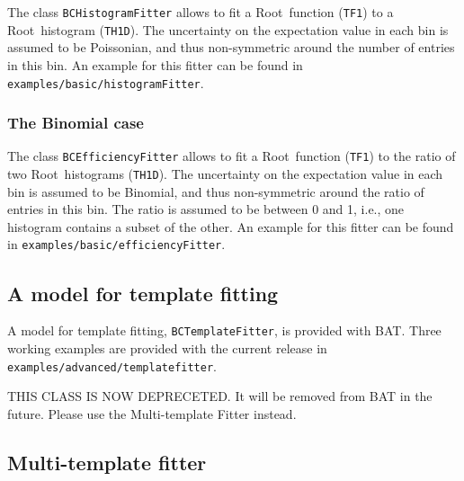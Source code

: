 \documentclass[11pt, a4paper]{article}
\newcommand{\Root}{{\sc Root}}
\begin{document}
The class \verb|BCHistogramFitter| allows to fit a \Root\ function
(\verb|TF1|) to a \Root\ histogram (\verb|TH1D|). The uncertainty on
the expectation value in each bin is assumed to be Poissonian, and
thus non-symmetric around the number of entries in this bin.  An
example for this fitter can be found in
\verb|examples/basic/histogramFitter|.


\subsubsection{The Binomial case}

The class \verb|BCEfficiencyFitter| allows to fit a \Root\ function
(\verb|TF1|) to the ratio of two \Root\ histograms (\verb|TH1D|). The
uncertainty on the expectation value in each bin is assumed to be
Binomial, and thus non-symmetric around the ratio of entries in this
bin. The ratio is assumed to be between 0 and 1, i.e., one histogram
contains a subset of the other.  An example for this fitter can be
found in \verb|examples/basic/efficiencyFitter|.

\subsection{A model for template fitting}

A model for template fitting, \verb|BCTemplateFitter|, is provided
with BAT. Three working examples are provided with the current release in
\verb|examples/advanced/templatefitter|.

\smallskip

THIS CLASS IS NOW DEPRECETED. \newline
It will be removed from BAT in the future.
Please use the Multi-template Fitter instead.



\clearpage
\pagebreak

\subsection{Multi-template fitter}
\label{section:MTF}

\end{document}
